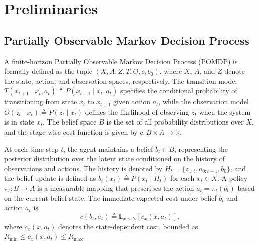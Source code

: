 \documentclass[acmlarge, manuscript, screen, review, natbib=false, oneside]{acmart}
\begin{document}
\section{Preliminaries}
\subsection{Partially Observable Markov Decision Process}\label{sec:POMDP_preliminaries}
A finite-horizon Partially Observable Markov Decision Process (POMDP) is formally defined as the tuple $(X, A, Z, T, O, c, b_0)$, where $X$, $A$, and $Z$ denote the state, action, and observation spaces, respectively. The transition model $T(x_{t+1} \mid x_t, a_t) \triangleq P(x_{t+1} \mid x_t, a_t)$ specifies the conditional probability of transitioning from state $x_t$ to $x_{t+1}$ given action $a_t$, while the observation model $O(z_t \mid x_t) \triangleq P(z_t \mid x_t)$ defines the likelihood of observing $z_t$ when the system is in state $x_t$. The belief space $B$ is the set of all probability distributions over $X$, and the stage-wise cost function is given by $c: B \times A \to \mathbb{R}$.

At each time step $t$, the agent maintains a belief $b_t \in B$, representing the posterior distribution over the latent state conditioned on the history of observations and actions. The history is denoted by $H_t = \{z_{1:t}, a_{0:t-1}, b_0\}$, and the belief update is defined as $b_t(x_t) \triangleq P(x_t \mid H_t)$ for each $x_t \in X$. A policy $\pi_t: B \to A$ is a measurable mapping that prescribes the action $a_t = \pi_t(b_t)$ based on the current belief state. The immediate expected cost under belief $b_t$ and action $a_t$ is
\begin{equation}
	c(b_t, a_t) \triangleq \mathbb{E}_{x \sim b_t}[c_x(x, a_t)],
\end{equation}
where $c_x(x, a_t)$ denotes the state-dependent cost, bounded as $R_{\min} \le c_x(x, a_t) \le R_{\max}$.
\end{document}
